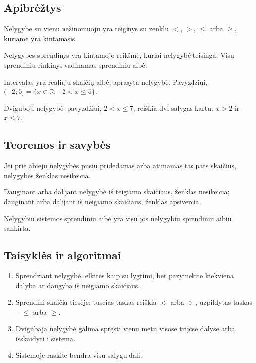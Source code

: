 \subsection{Apibrėžtys}
\begin{apibreztis}
Nelygybe su vienu nežinomuoju yra teiginys su zenklu $<$, $>$, $\le$ arba $\ge$, kuriame yra kintamasis.
\end{apibreztis}
\begin{apibreztis}
Nelygybes sprendinys yra kintamojo reikšmė, kuriai nelygybė teisinga. Visu sprendiniu rinkinys vadinamas sprendiniu aibė.
\end{apibreztis}
\begin{apibreztis}
Intervalas yra realiuju skaičių aibė, aprasyta nelygybė. Pavyzdziui, $(-2;5]=\{x\in\mathbb{R}:-2<x\le5\}$.
\end{apibreztis}
\begin{apibreztis}
Dviguboji nelygybė, pavyzdžiui, $2<x\le7$, reiškia dvi salygas kartu: $x>2$ ir $x\le7$.
\end{apibreztis}

\subsection{Teoremos ir savybės}
\begin{savybe}
Jei prie abieju nelygybės pusiu pridedamas arba atimamas tas pats skaičius, nelygybės ženklas nesikeicia.
\end{savybe}
\begin{savybe}
Dauginant arba dalijant nelygybė iš teigiamo skaičiaus, ženklas nesikeicia; dauginant arba dalijant iš neigiamo skaičiaus, ženklas apsivercia.
\end{savybe}
\begin{savybe}
Nelygybiu sistemos sprendiniu aibė yra visu jos nelygybiu sprendiniu aibiu sankirta.
\end{savybe}

\subsection{Taisyklės ir algoritmai}
\begin{enumerate}[label=\arabic*.]
\item Sprendziant nelygybė, elkitės kaip su lygtimi, bet pazymekite kiekviena dalyba ar daugyba iš neigiamo skaičiaus.
\item Sprendini skaičiu tiesėje: tuscias taskas reiškia $<$ arba $>$, uzpildytas taskas -- $\le$ arba $\ge$.
\item Dvigubaja nelygybė galima spręsti vienu metu visose trijose dalyse arba isskaidyti i sistema.
\item Sistemoje raskite bendra visu salygu dali.
\end{enumerate}
